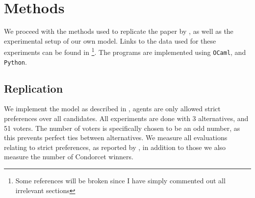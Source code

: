 \chapter{Methods}
\label{Methods}

We proceed with the methods used to replicate the paper by \citet{radDeliberationSinglePeakednessCoherent2021a}, as well as the experimental setup of our own model. Links to the data used for these experiments can be found in \footnote{Some references will be broken since I have simply commented out all irrelevant sections}. The programs are implemented using \texttt{OCaml}, and \texttt{Python}.


\section{Replication}
We implement the model as described in , agents are only allowed strict preferences over all candidates. All experiments are done with 3 alternatives, and 51 voters. The number of voters is specifically chosen to be an odd number, as this prevents perfect ties between alternatives. We measure all evaluations relating to strict preferences, as reported by \citet{radDeliberationSinglePeakednessCoherent2021a}, in addition to those we also measure the number of Condorcet winners.

